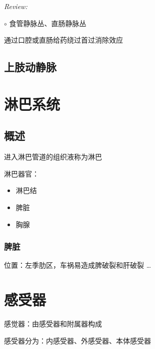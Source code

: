 \textit{Review:}

$\circ$ 食管静脉丛、直肠静脉丛
\begin{notation}
通过口腔或直肠给药绕过首过消除效应
\end{notation}
\subsection{上肢动静脉}%
\label{sub:上肢动静脉}

\section{淋巴系统}%
\label{sec:淋巴系统}
\subsection{概述}%
\label{sub:概述}
\begin{defi}
    进入淋巴管道的组织液称为淋巴
\end{defi}
\begin{notation}
    淋巴器官：\begin{itemize}
        \item 淋巴结
        \item 脾脏
        \item 胸腺
    \end{itemize}
\end{notation}
\subsubsection*{脾脏}%
\label{subsub:脾脏}
位置：左季肋区，车祸易造成脾破裂和肝破裂
\ldots 
\section{感受器}%
\label{sec:感受器}
\begin{defi}
    感觉器：由感受器和附属器构成
\end{defi}
感受器分为：内感受器、外感受器、本体感受器
